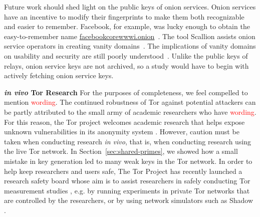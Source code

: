 Future work should shed light on the public keys of onion services.  Onion
services have an incentive to modify their fingerprints to make them both
recognizable and easier to remember.  Facebook, for example, was lucky enough to
obtain the easy-to-remember name \url{facebookcorewwwi.onion}~\cite{facebook}.
The tool Scallion assists onion service operators in creating vanity
domains~\cite{scallion}.  The implications of vanity domains on usability and
security are still poorly understood~\cite{vanity-domains}.  Unlike the public
keys of relays, onion service keys are not archived, so a study would have to
begin with actively fetching onion service keys.

\textbf{\textit{in vivo} Tor Research} For the purposes of completeness, we feel compelled to mention \textcolor{red}{wording}. The continued robustness of Tor against potential attackers can be partly attributed to the small army of academic researchers who have \textcolor{red}{wording}. For this reason, the Tor project welcomes academic research that helps expose unknown vulnerabilities in its anonymity system \cite{torresearch}. However, caution must be taken when conducting research \textit{in vivo}, that is, when conducting research using the live Tor network. In Section~\ref{sec:shared-primes}, we showed how a small mistake in key generation led to many weak keys in the Tor network. In order to help keep researchers and users safe, The Tor Project has recently launched a research safety board whose aim is to assist researchers in safely conducting Tor measurement studies \cite{vanity-domains}, e.g. by running experiments in private Tor networks that are controlled by the researchers, or by using network simulators such as Shadow \cite{stem}.
